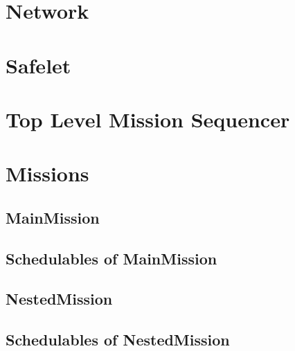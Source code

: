 \documentclass[10pt,a4paper]{article}
\begin{document}
\section{Network}

\newpage

\section{Safelet}

\newpage

\section{Top Level Mission Sequencer}

\newpage

\section{Missions}


\subsection{MainMission}

\newpage

\subsection{Schedulables of MainMission}



\subsection{NestedMission}

\newpage

\subsection{Schedulables of NestedMission}


\end{document}
